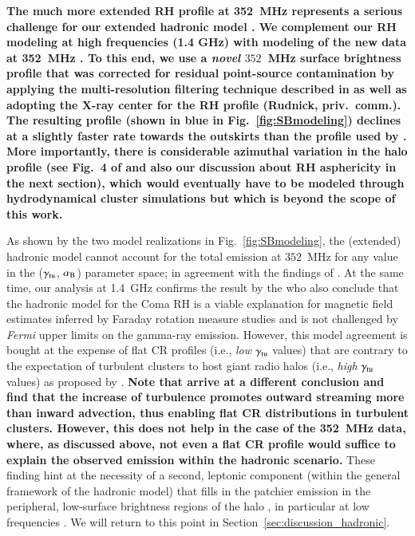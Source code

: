 \documentclass[useAMS,usenatbib]{mn2e}
\begin{document}
{\bf The much more extended RH profile at 352~MHz represents a serious challenge
  for our extended hadronic model \citep{2012arXiv1207.3025B}. We complement our
  RH modeling at high frequencies (1.4 GHz) with modeling of the new data at
  352~MHz \citep{2011MNRAS.412....2B}. To this end, we use a {\em novel}
  $352$~MHz surface brightness profile that was corrected for residual
  point-source contamination by applying the multi-resolution filtering
  technique described in \citet{2002PASP..114..427R} as well as adopting the
  X-ray center for the RH profile (Rudnick, priv.{\ }comm.). The resulting
  profile (shown in blue in Fig.~\ref{fig:SBmodeling}) declines at a slightly
  faster rate towards the outskirts than the profile used by
  \citet{2012arXiv1207.3025B}. More importantly, there is considerable azimuthal
  variation in the halo profile (see Fig.{\ }4 of \citealp{2011MNRAS.412....2B}
  and also our discussion about RH asphericity in the next section), which would
  eventually have to be modeled through hydrodynamical cluster simulations but
  which is beyond the scope of this work.}

As shown by the two model realizations in Fig.~\ref{fig:SBmodeling}, the
(extended) hadronic model cannot account for the total emission at $352$~MHz for
any value in the ($\gamma_{{\mathrm{tu}}}$, $\alpha_{{\mathrm{B}}}$) parameter space; in
agreement with the findings of \citet{2012arXiv1207.3025B}. At the same time,
our analysis at 1.4~GHz confirms the result by the \citet{2012...VERITAS} who
also conclude that the hadronic model for the Coma RH is a viable explanation
for magnetic field estimates inferred by Faraday rotation measure studies
\citep{2010A&A...513A..30B} and is not challenged by {\em Fermi} upper limits on
the gamma-ray emission. However, this model agreement is bought at the expense
of flat CR profiles (i.e., {\em low} $\gamma_{{\mathrm{tu}}}$ values) that are
contrary to the expectation of turbulent clusters to host giant radio halos
(i.e., {\em high} $\gamma_{{\mathrm{tu}}}$ values) as proposed by
\citet{2011A&A...527A..99E}. {\bf Note that \cite{2013arXiv1303.4746W} arrive at
  a different conclusion and find that the increase of turbulence promotes
  outward streaming more than inward advection, thus enabling flat CR
  distributions in turbulent clusters. However, this does not help in the case
  of the 352~MHz data, where, as discussed above, not even a flat CR profile
  would suffice to explain the observed emission within the hadronic scenario.}
These finding hint at the necessity of a second, leptonic component (within the
general framework of the hadronic model) that fills in the patchier emission in
the peripheral, low-surface brightness regions of the halo
\citep{2008MNRAS.385.1211P}, in particular at low frequencies \cite[see Fig.~3
of][]{2011MNRAS.412....2B}. We will return to this point in
Section~\ref{sec:discussion_hadronic}.
\end{document}
